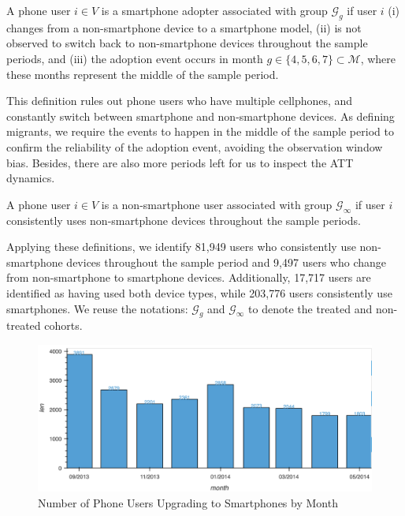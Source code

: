 \begin{definition}\label{def:smartphone_adopter}
A phone user $i \in V$ is a smartphone adopter associated with group $\mathcal{G}_g$ if user $i$ (i) changes from a non-smartphone device to a smartphone model, (ii) is not observed to switch back to non-smartphone devices throughout the sample periods, and (iii) the adoption event occurs in month $g \in \{4,5,6,7\} \subset \mathcal{M}$, where these months represent the middle of the sample period.
\end{definition}

This definition rules out phone users who have multiple cellphones, and constantly switch between smartphone and non-smartphone devices.
As defining migrants, we require the events to happen in the middle of the sample period to confirm the reliability of the adoption event, avoiding the observation window bias.
Besides, there are also more periods left for us to inspect the ATT dynamics.

\begin{definition}
A phone user $i \in V$ is a non-smartphone user associated with group $\mathcal{G}_{\infty}$ if user $i$ consistently uses non-smartphone devices throughout the sample periods.
\end{definition}

Applying these definitions, we identify 81,949 users who consistently use non-smartphone devices throughout the sample period and 9,497 users who change from non-smartphone to smartphone devices. Additionally, 17,717 users are identified as having used both device types, while 203,776 users consistently use smartphones.
We reuse the notations: \( \mathcal{G}_g \) and \( \mathcal{G}_{\infty} \) to denote the treated and non-treated cohorts.


\begin{figure}[h!]
\centering
\caption{Number of Phone Users Upgrading to Smartphones by Month}
\vspace{0.1cm}

\includegraphics[scale=0.51]{figures/number_of_smartphone_adopters.png}


\label{fig:number_of_smartphone_changers}
\end{figure}

